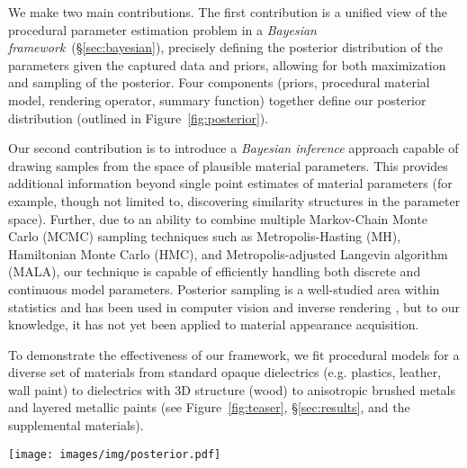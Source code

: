 We make two main contributions. The first contribution is a unified view of the procedural parameter estimation problem in a \emph{Bayesian framework}~(\S\ref{sec:bayesian}), precisely defining the posterior distribution of the parameters given the captured data and priors, allowing for both maximization and sampling of the posterior. Four components (priors, procedural material model, rendering operator, summary function) together define our posterior distribution (outlined in Figure~\ref{fig:posterior}). %

Our second contribution is to introduce a \emph{Bayesian inference} approach capable of drawing samples from the space of plausible material parameters.
This provides additional information beyond single point estimates of material parameters (for example, though not limited to, discovering similarity structures in the parameter space).
Further, due to an ability to combine multiple Markov-Chain Monte Carlo (MCMC) sampling techniques such as Metropolis-Hasting (MH), Hamiltonian Monte Carlo (HMC), and Metropolis-adjusted Langevin algorithm (MALA), our technique is capable of efficiently handling both discrete and continuous model parameters.
Posterior sampling is a well-studied area within statistics and has been used in computer vision and inverse rendering \cite{Picture}, but to our knowledge, it has not yet been applied to material appearance acquisition.

To demonstrate the effectiveness of our framework, we fit procedural models for a diverse set of materials from standard opaque dielectrics (e.g. plastics, leather, wall paint) to dielectrics with 3D structure (wood) to anisotropic brushed metals and layered metallic paints (see Figure~\ref{fig:teaser}, \S\ref{sec:results}, and the supplemental materials).


\begin{figure*}[t]
	\texttt{[image: images/img/posterior.pdf]}
	\caption{Our posterior computation combines priors, a procedural material model, a rendering operator, a summary function, and a target image. This posterior distribution can then be sampled to provide plausible values of the parameter vector. The value of the posterior is computed up to a normalization term, which does not effect MCMC sampling. The entire posterior definition is differentiable in the material parameters (excluding optional discrete model parameters).}
	\label{fig:posterior}
\end{figure*}
